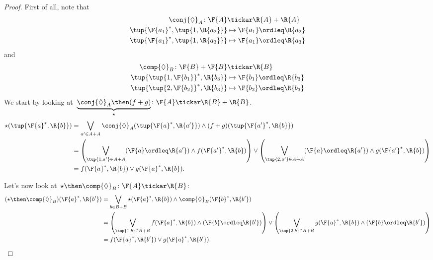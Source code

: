 \begin{proof}
First of all, note that 
\begin{equation}
    \begin{aligned}
    \conj{\Diamond}_A\colon \F{A}&\tickar \R{A}+\R{A}\\
    \tup{\F{a_1}^*,\tup{1,\R{a_2}}}&\mapsto \F{a_1}\ordleq \R{a_2}\\
    \tup{\F{a_1}^*,\tup{1,\R{a_3}}}&\mapsto \F{a_1}\ordleq \R{a_3}
    \end{aligned}
\end{equation}
and
\begin{equation}
    \begin{aligned}
    \comp{\Diamond}_B\colon \F{B}+\F{B}&\tickar \R{B}\\
    \tup{\tup{1,\F{b_1}}^*,\R{b_3}}&\mapsto \F{b_1}\ordleq \R{b_3}\\
    \tup{\tup{2,\F{b_2}}^*,\R{b_3}}&\mapsto \F{b_2}\ordleq \R{b_3}
    \end{aligned}
\end{equation}
We start by looking at~$\underbrace{\conj{\Diamond}_A\then (f+g)}_{\star}\colon \F{A} \tickar \R{B}+\R{B}$. 
\begin{equation}
    \begin{aligned}
    \star (\tup{\F{a}^*,\R{b}})&=\bigvee_{a'\in A+A} \conj{\Diamond}_A(\tup{\F{a}^*,\R{a'}})\wedge (f+g)(\tup{\F{a'}^*,\R{b}})\\
    &=\left( \bigvee_{\tup{1,a'}\in A+A} (\F{a}\ordleq \R{a'})\wedge f(\F{a'}^*,\R{b}) \right)\vee \left( \bigvee_{\tup{2,a'}\in A+A} (\F{a}\ordleq \R{a'})\wedge g(\F{a'}^*,\R{b}) \right)\\
    &=f(\F{a}^*,\R{b}) \vee g(\F{a}^*,\R{b}).
    \end{aligned}
\end{equation}

Let's now look at~$\star \then \comp{\Diamond}_B\colon \F{A} \tickar \R{B}$:
\begin{equation}
    \begin{aligned}
    (\star \then \comp{\Diamond}_B)(\F{a}^*,\R{b'})&=\bigvee_{b\in B+B} \star(\F{a}^*,\R{b})\wedge \comp{\Diamond}_B(\F{b}^*,\R{b'}) \\
    &=\left(\bigvee_{\tup{1,b}\in B+B} f(\F{a}^*,\R{b}) \wedge (\F{b}\ordleq \R{b'})\right) \vee 
    \left(\bigvee_{\tup{2,b}\in B+B} g(\F{a}^*,\R{b}) \wedge (\F{b}\ordleq \R{b'})\right)\\
    &=f(\F{a}^*,\R{b'})\vee g(\F{a}^*,\R{b'}).
    \end{aligned}
\end{equation}
\end{proof}

